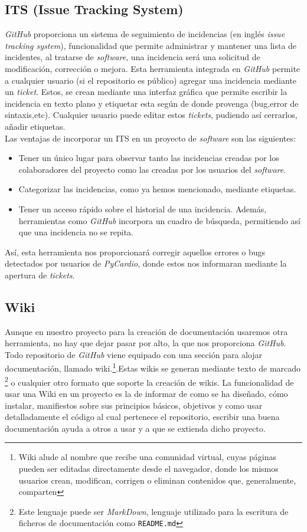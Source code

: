 \subsection{ITS (Issue Tracking System)}
\label{subsec:issue}
\emph{GitHub} proporciona un sistema de seguimiento de incidencias (en inglés \textit{issue tracking system}), funcionalidad que permite administrar y mantener una lista de incidentes, al tratarse de \emph{software}, una incidencia será una solicitud de modificación, corrección o mejora. Esta herramienta integrada en \emph{GitHub} permite a cualquier usuario (si el repositorio es público) agregar una incidencia mediante un \emph{ticket}. Estos, se crean mediante una interfaz gráfica que permite escribir la incidencia en texto plano y etiquetar esta según de donde provenga (bug,error de sintaxis,etc). Cualquier usuario puede editar estos \emph{tickets}, pudiendo así cerrarlos, añadir etiquetas. \\
Las ventajas de incorporar un ITS  en un proyecto de \emph{software} son las siguientes:
\begin{itemize}
    \item Tener un único lugar para observar tanto las incidencias creadas por los colaboradores del proyecto como las creadas por los usuarios del \emph{software}.
    \item Categorizar las incidencias, como ya hemos mencionado, mediante etiquetas.
    \item Tener un acceso rápido sobre el historial de una incidencia. Además, herramientas como \emph{GitHub} incorpora un cuadro de búsqueda, permitiendo así que una incidencia no se repita.
\end{itemize}
Así, esta herramienta nos proporcionará corregir aquellos errores o bugs detectados por usuarios de \emph{PyCardio}, donde estos nos informaran mediante la apertura de \emph{tickets}.

\subsection{Wiki}
\label{subsec:wiki}
Aunque en nuestro proyecto para la creación de documentación usaremos otra herramienta, no hay que dejar pasar por alto, la que nos proporciona \emph{GitHub}.\\
Todo repositorio de \emph{GitHub} viene equipado con una sección para alojar documentación, llamado wiki.\footnote{Wiki alude al nombre que recibe una comunidad virtual, cuyas páginas pueden ser editadas directamente desde el navegador, donde los mismos usuarios crean, modifican, corrigen o eliminan contenidos que, generalmente, comparten}.Estas wikis se generan mediante texto de marcado \footnote{Este lenguaje puede ser \emph{MarkDown}, lenguaje utilizado para la escritura de ficheros de documentación como \texttt{README.md}} o cualquier otro formato que soporte la creación de wikis. La funcionalidad de usar una Wiki en un proyecto es la de informar de como se ha diseñado, cómo instalar, manifiestos sobre sus principios básicos, objetivos y como usar detalladamente el código al cual pertenece el repositorio, escribir una buena documentación ayuda a otros a usar y a que se extienda dicho proyecto.

